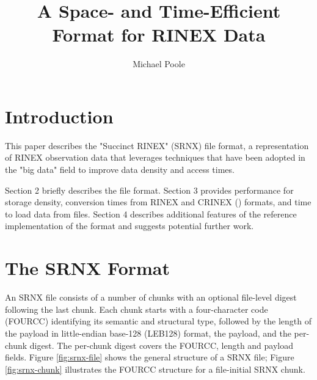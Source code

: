 \documentclass[letterpaper,times]{IONconf-v2}
\title{A Space- and Time-Efficient Format for RINEX Data}
\author[1]{Michael Poole}
\begin{document}


\maketitle

\section{Introduction}

This paper describes the "Succinct RINEX" (SRNX) file format, a
representation of RINEX observation data that leverages techniques that
have been adopted in the "big data" field to improve data density and
access times.

Section 2 briefly describes the file format.
Section 3 provides performance for storage density, conversion times
from RINEX and CRINEX (\cite{RNXCMP}) formats, and time to load data
from files.
Section 4 describes additional features of the reference implementation
of the format and suggests potential further work.

\section{The SRNX Format}

An SRNX file consists of a number of chunks with an optional file-level
digest following the last chunk.
Each chunk starts with a four-character code (FOURCC) identifying its
semantic and structural type, followed by the length of the payload in
little-endian base-128 (LEB128) format, the payload, and the per-chunk
digest.
The per-chunk digest covers the FOURCC, length and payload fields.
Figure \ref{fig:srnx-file} shows the general structure of a SRNX file;
Figure \ref{fig:srnx-chunk} illustrates the FOURCC structure for a
file-initial SRNX chunk.
\end{document}
